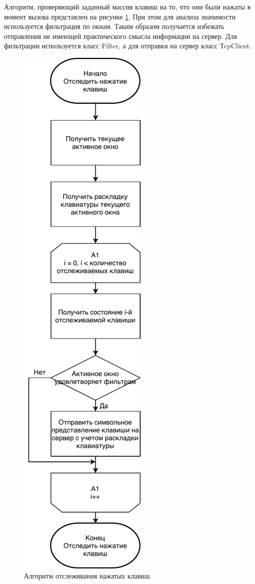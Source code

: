 Алгоритм, проверяющий заданный массив клавиш на то, что они были нажаты в момент вызова представлен на рисунке \ref*{sec:development:algos:logkeys}. При этом для анализа значимости используется фильтрация по окнам. Таким образом получается избежать отправления не имеющей практического смысла информации на сервер. Для фильтрации используется класс Filter, а для отправки на сервер класс TcpClient.

\begin{figure}[hb]
	\centering
	  \includegraphics[scale=1]{attachments/LogKeys.pdf}  
	  \caption{ Алгоритм отслеживания нажатых клавиш }
	  \label{sec:development:algos:logkeys}
\end{figure}



